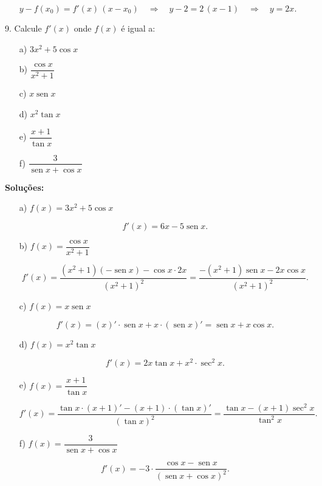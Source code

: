 \documentclass[12pt,openright,twoside,a4paper]{article}
\theoremstyle{definition}
\renewcommand{\sin}{\operatorname{sen}} %
\begin{document}
	
	\[
	y - f(x_0) = f'(x)\,(x - x_0)
	\quad\Longrightarrow\quad
	y - 2 = 2\,(x - 1)
	\quad\Longrightarrow\quad
	y = 2x.
	\]
	
	9. Calcule \( f'(x) \) onde \( f(x) \) é igual a:
	
	\begin{itemize}
		\item[a)] \( 3x^2 + 5\cos x \)
		\item[b)] \( \dfrac{\cos x}{x^2 + 1} \)
		\item[c)] \( x \sin x \)
		\item[d)] \( x^2 \tan x \)
		\item[e)] \( \dfrac{x + 1}{\tan x} \)
		\item[f)] \( \dfrac{3}{\sin x + \cos x} \)
	\end{itemize}
	
	\vspace{1em}
	
	\textbf{Soluções:}
	
	\begin{itemize}
		\item[a)] \( f(x) = 3x^2 + 5\cos x \)
		
		
		\[
		f'(x) = 6x - 5\sin x.
		\]
		
		
		
		\item[b)] \( f(x) = \dfrac{\cos x}{x^2 + 1} \)
		
		
		\[
		f'(x)
		= \dfrac{(x^2 + 1)(-\sin x) - \cos x \cdot 2x}{(x^2 + 1)^2}
		= \dfrac{-(x^2 + 1)\sin x - 2x\cos x}{(x^2 + 1)^2}.
		\]
		
		
		
		\item[c)] \( f(x) = x\sin x \)
		
		
		\[
		f'(x)
		= (x)'\cdot\sin x + x\cdot(\sin x)'
		= \sin x + x\cos x.
		\]
		
		
		
		\item[d)] \( f(x) = x^2\tan x \)
		
		
		\[
		f'(x)
		= 2x\tan x + x^2\cdot\sec^2 x.
		\]
		
		
		
		\item[e)] \( f(x) = \dfrac{x + 1}{\tan x} \)
		
		
		\[
		f'(x)
		= \dfrac{\tan x \cdot (x + 1)' - (x + 1)\cdot(\tan x)'}{(\tan x)^2}
		= \dfrac{\tan x - (x + 1)\sec^2 x}{\tan^2 x}.
		\]
		
		
		
		\item[f)] \( f(x) = \dfrac{3}{\sin x + \cos x} \)
		
		
		\[
		f'(x)
		= -3\cdot\dfrac{\cos x - \sin x}{(\sin x + \cos x)^2}.
		\]
		
		
	\end{itemize}
	
\end{document}
